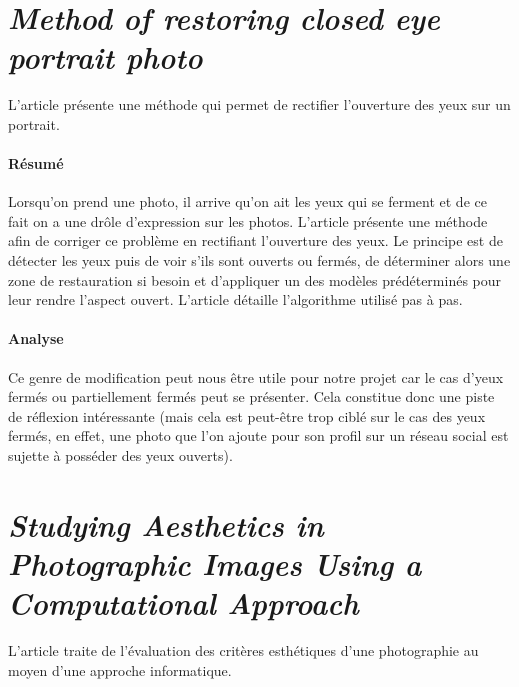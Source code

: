 \documentclass[11pt, french,screen]{report-rd-info}
\begin{document}
\section{\emph{Method of restoring closed eye portrait photo}}
L'article \cite{Li2011} présente une méthode qui permet de rectifier l'ouverture des yeux sur un portrait.
\paragraph{Résumé}
Lorsqu'on prend une photo, il arrive qu'on ait les yeux qui se ferment et de ce fait on a une drôle d'expression sur les photos. L'article présente une méthode afin de corriger ce problème en rectifiant l'ouverture des yeux.
Le principe est de détecter les yeux puis de voir s'ils sont ouverts ou fermés, de déterminer alors une zone de restauration si besoin et d'appliquer un des modèles prédéterminés pour leur rendre l'aspect ouvert.
L'article détaille l'algorithme utilisé pas à pas.
\paragraph{Analyse}
Ce genre de modification peut nous être utile pour notre projet car le cas d'yeux fermés ou partiellement fermés peut se présenter. Cela constitue donc une piste de réflexion intéressante (mais cela est peut-être trop ciblé sur le cas des yeux fermés, en effet, une photo que l'on ajoute pour son profil sur un réseau social est sujette à posséder des yeux ouverts).
\section{\emph{Studying Aesthetics in Photographic Images Using a Computational Approach}}
L'article \cite{Datta} traite de l'évaluation des critères esthétiques d'une photographie au moyen d'une approche informatique.
\end{document}
